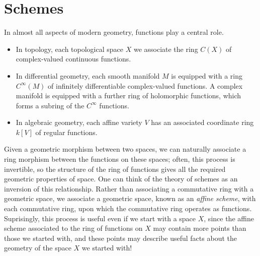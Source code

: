 \chapter{Schemes}

In almost all aspects of modern geometry, functions play a central role.
%
\begin{itemize}
    \item In topology, each topological space $X$ we associate the ring $C(X)$ of complex-valued continuous functions.
    \item In differential geometry, each smooth manifold $M$ is equipped with a ring $C^\infty(M)$ of infinitely differentiable complex-valued functions. A complex manifold is equipped with a further ring of holomorphic functions, which forms a subring of the $C^\infty$ functions.
    \item In algebraic geometry, each affine variety $V$ has an associated coordinate ring $k[V]$ of regular functions.
\end{itemize}
%
Given a geometric morphism between two spaces, we can naturally associate a ring morphism between the functions on these spaces; often, this process is invertible, so the structure of the ring of functions gives all the required geometric properties of space. One can think of the theory of schemes as an inversion of this relationship. Rather than associating a commutative ring with a geometric space, we associate a geometric space, known as an {\it affine scheme}, with each commutative ring, upon which the commutative ring operates as functions. Suprisingly, this process is useful even if we start with a space $X$, since the affine scheme associated to the ring of functions on $X$ may contain more points than those we started with, and these points may describe useful facts about the geometry of the space $X$ we started with!

